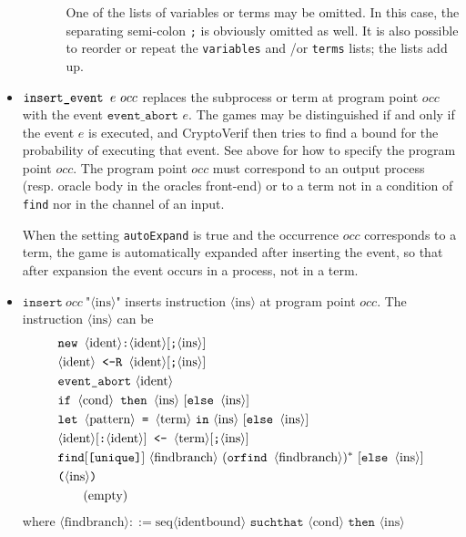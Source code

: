 \documentclass{article}
\newcommand{\nonterm}[1]{\langle\textrm{#1}\rangle}
\newcommand{\seq}[1]{\textrm{seq}\nonterm{#1}}
\begin{document}
\begin{itemize}
\begin{itemize}
\begin{enumerate}
One of the lists of variables or terms may be omitted.
In this case, the separating semi-colon \texttt{;} is obviously
omitted as well. It is also possible to reorder or repeat the
\texttt{variables} and /or \texttt{terms} lists; the lists add up.

\end{enumerate}
\end{itemize}

\sloppy

\item $\texttt{insert\string_event }e\ occ$ replaces the subprocess or term at
program point $occ$ with the event $\texttt{event\_abort }e$. The games may
be distinguished if and only if the event $e$ is executed, and CryptoVerif
then tries to find a bound for the probability of executing that event.
See above for how to specify the program point $occ$.
The program point $occ$ must correspond to an output process
(resp. oracle body in the oracles front-end) or to a term not in a
condition of {\tt find} nor in the channel of an input.

\fussy

When the setting {\tt autoExpand} is true and the occurrence $occ$
corresponds to a term, the game is automatically expanded after
inserting the event, so that after expansion the event occurs in a
process, not in a term.

\item $\texttt{insert}\ occ\ \texttt{"}\nonterm{ins}\texttt{"}$ inserts instruction $\nonterm{ins}$ at
program point $occ$. The instruction $\nonterm{ins}$ can be 
\begin{align*}
&\Resavt[\texttt{;}\nonterm{ins}]\\
  &\Resbvt[\texttt{;}\nonterm{ins}]\\
  &\texttt{event\_abort}\ \nonterm{ident}\\
&\texttt{if }\nonterm{cond}\texttt{ then }\nonterm{ins}\ [\texttt{else }\nonterm{ins}]\\
&\texttt{let }\nonterm{pattern} \texttt{ = }\nonterm{term}\ \texttt{in}\ \nonterm{ins}\ [\texttt{else }\nonterm{ins}]\\
&\nonterm{ident}[\texttt{:}\nonterm{ident}] \texttt{ <- }\nonterm{term}[\texttt{;}\nonterm{ins}]\\
  &\texttt{find}[\texttt{[unique]}]\ \nonterm{findbranch}\ (\texttt{orfind }\nonterm{findbranch})^*\ [\texttt{else }\nonterm{ins}]\\
  &\texttt{(}\nonterm{ins}\texttt{)}\\
  &\tag{empty}
\end{align*}
where $\nonterm{findbranch} ::= \seq{identbound} \texttt{ suchthat }\nonterm{cond}\texttt{ then }\nonterm{ins}$


\end{itemize}
\end{document}
